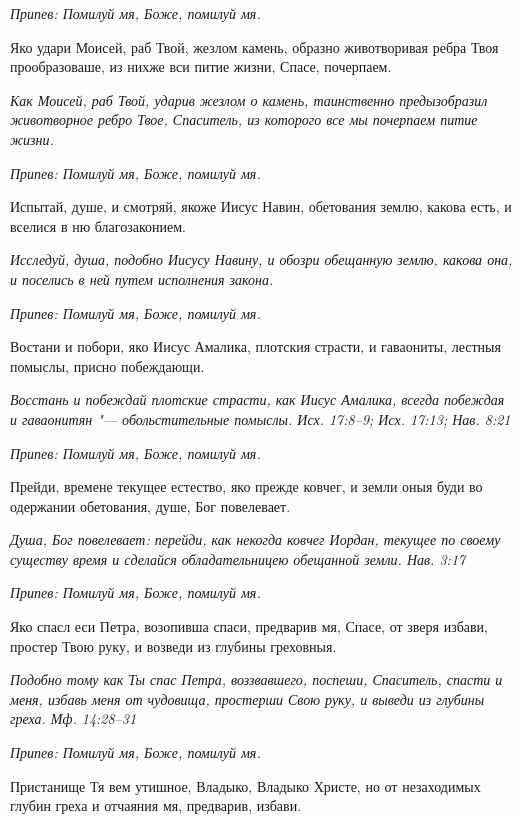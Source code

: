 \itshape Припев:\normalfont{} Помилуй мя, Боже, помилуй мя.


Яко удари Моисей, раб Твой, жезлом камень, образно животворивая ребра Твоя прообразоваше, из нихже вси питие жизни, Спасе, почерпаем.


\itshape Как Моисей, раб Твой, ударив жезлом о камень, таинственно предызобразил животворное ребро Твое, Спаситель, из которого все мы почерпаем питие жизни.\normalfont{}


\itshape Припев:\normalfont{} Помилуй мя, Боже, помилуй мя.


Испытай, душе, и смотряй, якоже Иисус Навин, обетования землю, какова есть, и вселися в ню благозаконием.


\itshape Исследуй, душа, подобно Иисусу Навину, и обозри обещанную землю, какова она, и поселись в ней путем исполнения закона.\normalfont{}


\itshape Припев:\normalfont{} Помилуй мя, Боже, помилуй мя.


Востани и побори, яко Иисус Амалика, плотския страсти, и гаваониты, лестныя помыслы, присно побеждающи.


\itshape Восстань и побеждай плотские страсти, как Иисус Амалика, всегда побеждая и гаваонитян "--- обольстительные помыслы. Исх. 17:8–9; Исх. 17:13; Нав. 8:21\normalfont{}


\itshape Припев:\normalfont{} Помилуй мя, Боже, помилуй мя.


Прейди, времене текущее естество, яко прежде ковчег, и земли оныя буди во одержании обетования, душе, Бог повелевает.


\itshape Душа, Бог повелевает: перейди, как некогда ковчег Иордан, текущее по своему существу время и сделайся обладательницею обещанной земли. Нав. 3:17\normalfont{}


\itshape Припев:\normalfont{} Помилуй мя, Боже, помилуй мя.


Яко спасл еси Петра, возопивша спаси, предварив мя, Спасе, от зверя избави, простер Твою руку, и возведи из глубины греховныя.


\itshape Подобно тому как Ты спас Петра, воззвавшего, поспеши, Спаситель, спасти и меня, избавь меня от чудовища, простерши Свою руку, и выведи из глубины греха. Мф. 14:28–31\normalfont{}


\itshape Припев:\normalfont{} Помилуй мя, Боже, помилуй мя.


Пристанище Тя вем утишное, Владыко, Владыко Христе, но от незаходимых глубин греха и отчаяния мя, предварив, избави.


